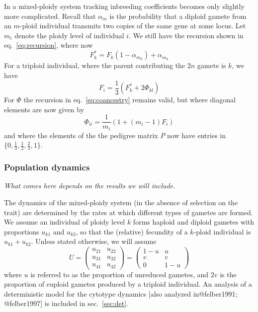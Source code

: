 In a mixed-ploidy system tracking inbreeding coefficients becomes only
slightly more complicated. Recall that \(\alpha_m\) is the probability
that a diploid gamete from an \(m\)-ploid individual transmits two
copies of the same gene at some locus. Let \(m_i\) denote the ploidy
level of individual \(i\). We still have the recursion shown in
eq.~\ref{eq:recursion}, where now
\[F_k^\ast = F_k(1-\alpha_{m_k}) + \alpha_{m_k}\] For a triploid
individual, where the parent contributing the \(2n\) gamete is \(k\), we
have \[ F_i = \frac1 3 \left(F_k^\ast + 2\Phi_{kl}\right) \] For
\(\Phi\) the recursion in eq.~\ref{eq:coancestry} remains valid, but
where diagonal elements are now given by
\[\Phi_{ii} = \frac{1}{m_i} \left(1 + (m_i-1)F_i\right)\] and where the
elements of the the pedigree matrix \(P\) now have entries in
\(\{0,\frac1 3,\frac1 2,\frac2 3,1\}\).

\hypertarget{population-dynamics}{%
\subsubsection{Population dynamics}\label{population-dynamics}}

\emph{What comes here depends on the results we will include.}

The dynamics of the mixed-ploidy system (in the absence of selection on
the trait) are determined by the rates at which different types of
gametes are formed. We assume an individual of ploidy level \(k\) forms
haploid and diploid gametes with proportions \(u_{k1}\) and \(u_{k2}\),
so that the (relative) fecundity of a \(k\)-ploid individual is
\(u_{k1} + u_{k2}\). Unless stated otherwise, we will assume \[U = 
    \begin{pmatrix} 
    u_{21} & u_{22} \\ 
    u_{31} & u_{32} \\ 
    u_{41} & u_{42} 
    \end{pmatrix} =
    \begin{pmatrix} 
    1-u & u \\
    v & v \\
    0 & 1-u
    \end{pmatrix}\] where \(u\) is referred to as the proportion of
unreduced gametes, and \(2v\) is the proportion of euploid gametes
produced by a triploid individual. An analysis of a deterministic model
for the cytotype dynamics {[}also analyzed in@felber1991; @felber1997{]}
is included in sec.~\ref{sec:det}.


